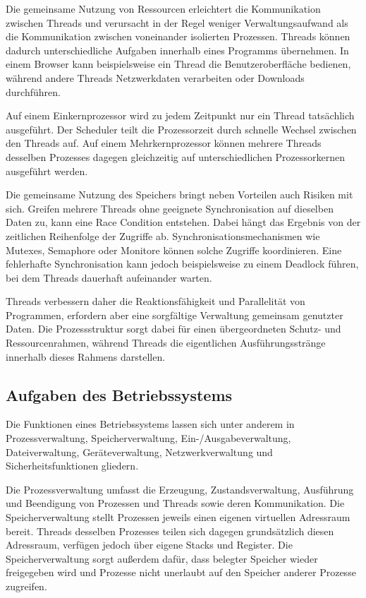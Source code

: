Die gemeinsame Nutzung von Ressourcen erleichtert die Kommunikation zwischen Threads und verursacht in der Regel weniger Verwaltungsaufwand als die Kommunikation zwischen voneinander isolierten Prozessen. Threads können dadurch unterschiedliche Aufgaben innerhalb eines Programms übernehmen. In einem Browser kann beispielsweise ein Thread die Benutzeroberfläche bedienen, während andere Threads Netzwerkdaten verarbeiten oder Downloads durchführen.

Auf einem Einkernprozessor wird zu jedem Zeitpunkt nur ein Thread tatsächlich ausgeführt. Der Scheduler teilt die Prozessorzeit durch schnelle Wechsel zwischen den Threads auf. Auf einem Mehrkernprozessor können mehrere Threads desselben Prozesses dagegen gleichzeitig auf unterschiedlichen Prozessorkernen ausgeführt werden.

Die gemeinsame Nutzung des Speichers bringt neben Vorteilen auch Risiken mit sich. Greifen mehrere Threads ohne geeignete Synchronisation auf dieselben Daten zu, kann eine Race Condition entstehen. Dabei hängt das Ergebnis von der zeitlichen Reihenfolge der Zugriffe ab. Synchronisationsmechanismen wie Mutexes, Semaphore oder Monitore können solche Zugriffe koordinieren. Eine fehlerhafte Synchronisation kann jedoch beispielsweise zu einem Deadlock führen, bei dem Threads dauerhaft aufeinander warten.

Threads verbessern daher die Reaktionsfähigkeit und Parallelität von Programmen, erfordern aber eine sorgfältige Verwaltung gemeinsam genutzter Daten. Die Prozessstruktur sorgt dabei für einen übergeordneten Schutz- und Ressourcenrahmen, während Threads die eigentlichen Ausführungsstränge innerhalb dieses Rahmens darstellen.

\subsection{Aufgaben des Betriebssystems}

Die Funktionen eines Betriebssystems lassen sich unter anderem in Prozessverwaltung, Speicherverwaltung, Ein-/Ausgabeverwaltung, Dateiverwaltung, Geräteverwaltung, Netzwerkverwaltung und Sicherheitsfunktionen gliedern.

Die Prozessverwaltung umfasst die Erzeugung, Zustandsverwaltung, Ausführung und Beendigung von Prozessen und Threads sowie deren Kommunikation. Die Speicherverwaltung stellt Prozessen jeweils einen eigenen virtuellen Adressraum bereit. Threads desselben Prozesses teilen sich dagegen grundsätzlich diesen Adressraum, verfügen jedoch über eigene Stacks und Register. Die Speicherverwaltung sorgt außerdem dafür, dass belegter Speicher wieder freigegeben wird und Prozesse nicht unerlaubt auf den Speicher anderer Prozesse zugreifen.

